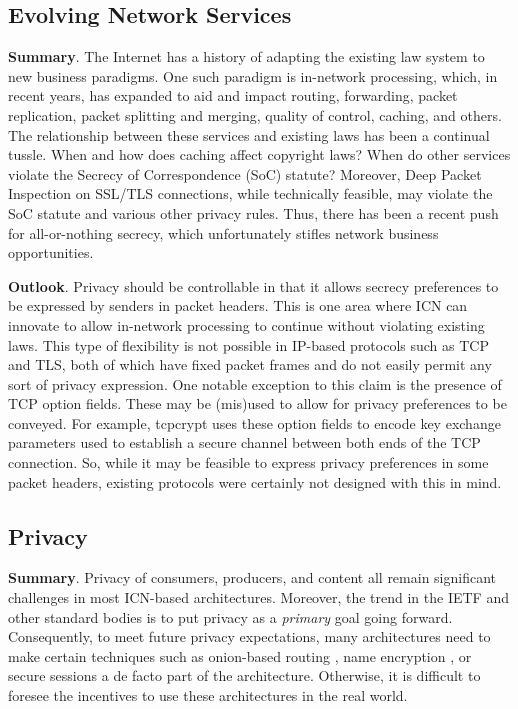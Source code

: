 \subsection{Evolving Network Services}
{\bf Summary}. The Internet has a history of adapting the existing law system to new business paradigms.
One such paradigm is in-network processing, which, in recent years, has expanded to
aid and impact routing, forwarding, packet replication, packet splitting and merging,
quality of control, caching, and others. The relationship between these services and
existing laws has been a continual tussle. When and how does caching affect copyright laws?
When do other services violate the Secrecy of Correspondence (SoC) statute?
Moreover, Deep Packet Inspection on SSL/TLS connections, while technically feasible, may violate
the SoC statute and various other privacy rules. Thus, there has been a recent push for
all-or-nothing secrecy, which unfortunately stifles network business opportunities.

{\bf Outlook}. Privacy should be controllable in that it allows secrecy preferences to be
expressed by senders in packet headers. This is one area where ICN can innovate to
allow in-network processing to continue without violating existing laws. This type
of flexibility is not possible in IP-based protocols such as TCP and TLS, both
of which have fixed packet frames and do not easily permit any sort of privacy expression.
One notable exception to this claim is the presence of TCP option fields. These may
be (mis)used to allow for privacy preferences to be conveyed. For example, tcpcrypt \cite{ietf-tcpinc-tcpcrypt-03}
uses these option fields to encode key exchange parameters used to establish
a secure channel between both ends of the TCP connection. So, while it may be feasible
to express privacy preferences in some packet headers, existing protocols were certainly
not designed with this in mind.

\subsection{Privacy}
{\bf Summary}. Privacy of consumers, producers, and content all remain significant
challenges in most ICN-based architectures. Moreover, the trend in the IETF and other
standard bodies is to put privacy as a \emph{primary} goal going forward. Consequently,
to meet future privacy expectations, many architectures need to make certain techniques
such as onion-based routing \cite{uzun2011anonymous}, name encryption \cite{privacy}, or secure
sessions \cite{wood-icnrg-ccnxkeyexchange-00} a de facto part of the architecture.
Otherwise, it is difficult to foresee the incentives to use these architectures in the
real world.

